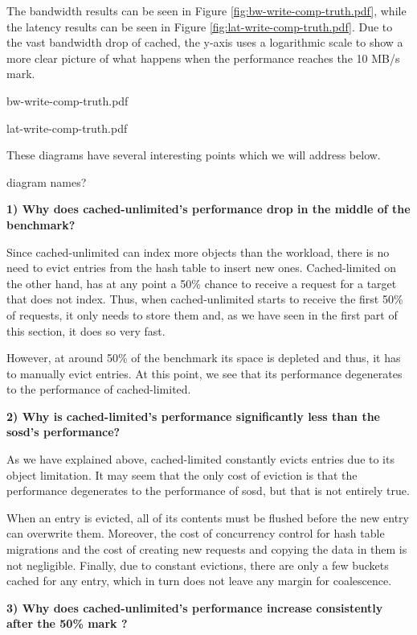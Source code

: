 The bandwidth results can be seen in Figure \ref{fig:bw-write-comp-truth.pdf}, 
while the latency results can be seen in Figure 
\ref{fig:lat-write-comp-truth.pdf}.  Due to the vast bandwidth drop of cached, 
the y-axis uses a logarithmic scale to show a more clear picture of what 
happens when the performance reaches the 10 MB/s mark.

{bw-write-comp-truth.pdf}

{lat-write-comp-truth.pdf}

These diagrams have several interesting points which we will address below.

\fixme diagram names?


\textbf{1) Why does cached-unlimited's performance drop in the middle of the 
	benchmark?}

Since cached-unlimited can index more objects than the workload, there is no 
need to evict entries from the hash table to insert new ones. Cached-limited on 
the other hand, has at any point a 50\% chance to receive a request for a 
target that does not index. Thus, when cached-unlimited starts to receive the 
first 50\% of requests, it only needs to store them and, as we have seen in the 
first part of this section, it does so very fast.

However, at around 50\% of the benchmark its space is depleted and thus, it has 
to manually evict entries. At this point, we see that its performance 
degenerates to the performance of cached-limited.

\textbf{2) Why is cached-limited's performance significantly less than the 
	sosd's performance?}

As we have explained above, cached-limited constantly evicts entries due to its 
object limitation. It may seem that the only cost of eviction is that the 
performance degenerates to the performance of sosd, but that is not entirely 
true.

When an entry is evicted, all of its contents must be flushed before the new 
entry can overwrite them. Moreover, the cost of concurrency control for hash 
table migrations and the cost of creating new requests and copying the data in 
them is not negligible. Finally, due to constant evictions, there are only a 
few buckets cached for any entry, which in turn does not leave any margin for 
coalescence.

\textbf{3) Why does cached-unlimited's performance increase consistently after 
	the 50\% mark ?}

